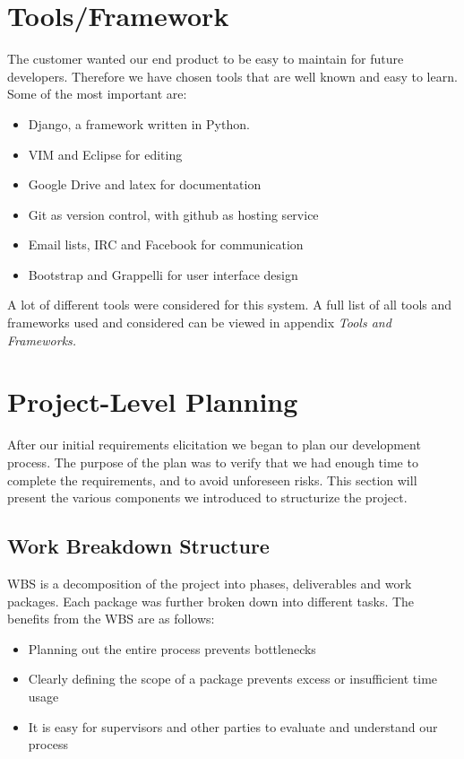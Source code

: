 \section{Tools/Framework}
The customer wanted our end product to be easy to maintain for future
developers. Therefore we have chosen tools that are well known and easy
to learn. Some of the most important are:

\begin{itemize}
    \item Django, a framework written in Python.
    \item VIM and Eclipse for editing
    \item Google Drive and latex for documentation
    \item Git as version control, with github as hosting service
    \item Email lists, IRC and Facebook for communication
    \item Bootstrap and Grappelli for user interface design
\end{itemize}
A lot of different tools were considered for this system. A full list of all
tools and frameworks used and considered can be viewed in appendix
\textit{Tools and Frameworks.}

\section{Project-Level Planning}
After our initial requirements elicitation we began to plan our
development process. The purpose of the plan was to verify that we had
enough time to complete the requirements, and to avoid unforeseen
risks. This section will present the various components we introduced
to structurize the project.

\subsection{Work Breakdown Structure}\label{section:WBS}
WBS is a decomposition of the project into phases, deliverables and work
packages. Each package was further broken down into different tasks.
The benefits from the WBS are as follows:
\begin{itemize}
    \item Planning out the entire process prevents bottlenecks
    \item Clearly defining the scope of a package prevents excess or
        insufficient time usage
    \item It is easy for supervisors and other parties to evaluate and
        understand our process
\end{itemize}

